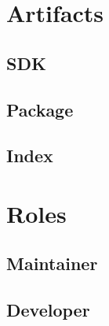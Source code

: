 \documentclass{beamer}
\begin{document}
\section{Artifacts}

\subsection{SDK}

\begin{frame}
\end{frame}

\subsection{Package}

\begin{frame}
\end{frame}

\subsection{Index}

\begin{frame}
\end{frame}

\section{Roles}

\subsection{Maintainer}

\begin{frame}
\end{frame}

\subsection{Developer}

\begin{frame}
\end{frame}
\end{document}
